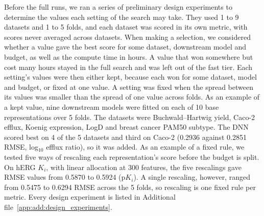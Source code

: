 Before the full runs, we ran a series of preliminary design experiments to determine the values each setting of the search may take. They used 1 to 9 datasets and 1 to 5 folds, and each dataset was scored in its own metric, with scores never averaged across datasets. When making a selection, we considered whether a value gave the best score for some dataset, downstream model and budget, as well as the compute time in hours. A value that won somewhere but cost many hours stayed in the full search and was left out of the fast tier. Each setting's values were then either kept, because each won for some dataset, model and budget, or fixed at one value. A setting was fixed when the spread between its values was smaller than the spread of one value across folds. As an example of a kept value, nine downstream models were fitted on each of 10 base representations over 5 folds. The datasets were Buchwald--Hartwig yield, Caco-2 efflux, Koenig expression, LogD and breast cancer PAM50 subtype. The DNN scored best on 4 of the 5 datasets and third on Caco-2 (0.2936 against 0.2851 RMSE, log$_{10}$ efflux ratio), so it was added. As an example of a fixed rule, we tested five ways of rescaling each representation's score before the budget is split. On hERG $K_i$, with linear allocation at 300 features, the five rescalings gave RMSE values from 0.5870 to 0.5924 (p$K_i$). A single rescaling, however, ranged from 0.5475 to 0.6294 RMSE across the 5 folds, so rescaling is one fixed rule per metric. Every design experiment is listed in Additional file~\ref{app:add:design_experiments}.

